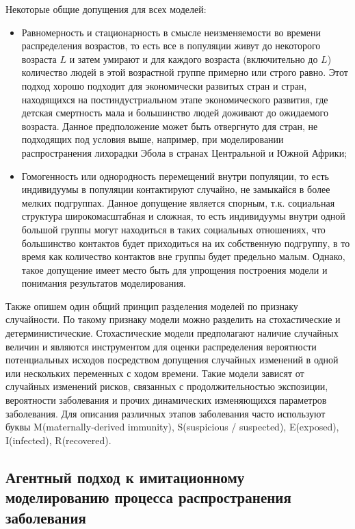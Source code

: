 Некоторые общие допущения для всех моделей:
\begin{itemize}
	\item Равномерность и стационарность в смысле неизменяемости во времени  распределения возрастов, то есть все в популяции живут до некоторого возраста $\mathit{L}$ и затем умирают и для каждого возраста (включительно до $\mathit{L}$) количество людей в этой возрастной группе примерно или строго равно. Этот подход хорошо подходит для экономически развитых стран и стран, находящихся на постиндустриальном этапе экономического развития, где детская смертность мала и большинство людей доживают до ожидаемого возраста. Данное предположение может быть отвергнуто для стран, не подходящих под условия выше, например, при моделировании распространения лихорадки Эбола в странах Центральной и Южной Африки;
	\item Гомогенность или однородность перемещений внутри популяции, то есть индивидуумы  в популяции контактируют случайно, не замыкайся в более мелких подгруппах. Данное допущение является спорным, т.к. социальная структура широкомасштабная и сложная, то есть индивидуумы внутри одной большой группы могут находиться в таких социальных отношениях, что большинство контактов будет приходиться на их собственную подгруппу, в то время как количество контактов вне группы будет предельно малым. Однако, такое допущение имеет место быть для упрощения построения модели   и понимания результатов моделирования.
\end{itemize}


Также опишем один общий принцип разделения моделей по признаку случайности. По такому признаку  модели можно разделить на стохастические и детерминистические. Стохастические модели предполагают наличие случайных величин  и являются инструментом для оценки распределения вероятности потенциальных исходов  посредством допущения случайных изменений в одной или нескольких переменных с ходом времени. Такие модели зависят от случайных изменений рисков, связанных с продолжительностью экспозиции, вероятности заболевания и прочих динамических изменяющихся параметров заболевания. Для описания различных этапов заболевания часто используют буквы M(maternally-derived immunity), S(suspicious / suspected), E(exposed), I(infected), R(recovered).

\subsection{Агентный подход к имитационному моделированию процесса распространения заболевания}


